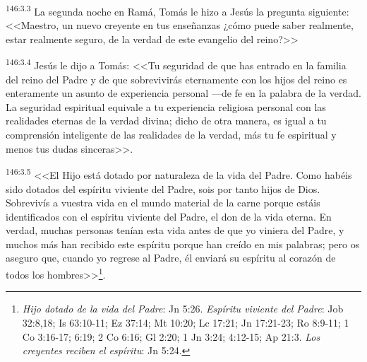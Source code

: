 \par 
\textsuperscript{146:3.3} La segunda noche en Ramá, Tomás le hizo a Jesús la pregunta siguiente: <<Maestro, un nuevo creyente en tus enseñanzas ¿cómo puede saber realmente, estar realmente seguro, de la verdad de este evangelio del reino?>>

\par 
\textsuperscript{146:3.4} Jesús le dijo a Tomás: <<Tu seguridad de que has entrado en la familia del reino del Padre y de que sobrevivirás eternamente con los hijos del reino es enteramente un asunto de experiencia personal ---de fe en la palabra de la verdad. La seguridad espiritual equivale a tu experiencia religiosa personal con las realidades eternas de la verdad divina; dicho de otra manera, es igual a tu comprensión inteligente de las realidades de la verdad, más tu fe espiritual y menos tus dudas sinceras>>.

\par 
\textsuperscript{146:3.5} <<El Hijo está dotado por naturaleza de la vida del Padre. Como habéis sido dotados del espíritu viviente del Padre, sois por tanto hijos de Dios. Sobrevivís a vuestra vida en el mundo material de la carne porque estáis identificados con el espíritu viviente del Padre, el don de la vida eterna. En verdad, muchas personas tenían esta vida antes de que yo viniera del Padre, y muchos más han recibido este espíritu porque han creído en mis palabras; pero os aseguro que, cuando yo regrese al Padre, él enviará su espíritu al corazón de todos los hombres>>\footnote{\textit{Hijo dotado de la vida del Padre}: Jn 5:26. \textit{Espíritu viviente del Padre}: Job 32:8,18; Is 63:10-11; Ez 37:14; Mt 10:20; Lc 17:21; Jn 17:21-23; Ro 8:9-11; 1 Co 3:16-17; 6:19; 2 Co 6:16; Gl 2:20; 1 Jn 3:24; 4:12-15; Ap 21:3. \textit{Los creyentes reciben el espíritu}: Jn 5:24.}.

